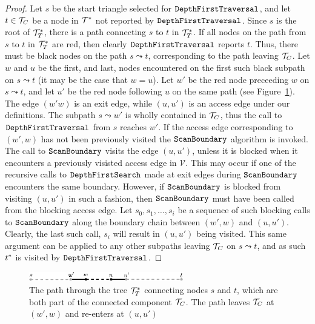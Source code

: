 {  \begin{proof}
  Let $s$ be the start triangle selected for $\texttt{DepthFirstTraversal}$,
  and let $t \in {\mathcal{T}}_C$ be a node in $\mathcal{T}^*$ not reported by 
  $\texttt{DepthFirstTraversal}$.
  Since $s$ is the root of $\mathcal{T}^*_T$, there is a path connecting $s$ 
  to $t$ in  $\mathcal{T}^*_T$. 
  If all nodes on the path from $s$ to $t$ in $\mathcal{T}^*_T$ are red, then
  clearly $\texttt{DepthFirstTraversal}$ reports $t$.
  Thus, there must be black nodes on the path $s \leadsto t$, corresponding to
  the path leaving ${\mathcal{T}}_C$.
  Let $w$ and $u$ be the first, and last, nodes encountered on the first such
  black subpath on $s \leadsto t$ (it may be the case that $w = u$).
  Let $w'$ be the red node preceeding $w$ on $s \leadsto t$, and let $u'$ be
  the red node following $u$ on the same path (see 
  Figure~\ref{fig:component_subpaths}).
  The edge $(w'w)$ is an exit edge, while $(u,u')$ is an access edge under
  our definitions. 
  The subpath $s \leadsto w'$ is wholly contained in ${\mathcal{T}}_C$, thus the call
  to $\texttt{DepthFirstTraversal}$ from $s$ reaches $w'$.
  If the access edge corresponding to $(w',w)$ has not 
  been previously visited the $\texttt{ScanBoundary}$ algorithm is invoked.
  The call to $\texttt{ScanBoundary}$ visits the edge $(u,u')$, unless it
  is blocked when it encounters a previously visisted access edge in 
  $\mathcal{V}$.
  This may  occur if one of the recursive 
  calls to $\texttt{DepthFirstSearch}$ made at exit edges during 
  $\texttt{ScanBoundary}$ 
  encounters the same boundary. 
  However, if $\texttt{ScanBoundary}$ is blocked from visiting $(u,u')$ in 
  such a fashion, then $\texttt{ScanBoundary}$ must have been called
  from the blocking access edge. 
  Let $s_0, s_1, \ldots, s_i$ be a sequence of such blocking calls to 
  $\texttt{ScanBoundary}$ along the boundary chain between $(w',w)$ 
  and $(u,u')$. 
  Clearly, the last such call, $s_i$ will result in $(u,u')$ being visited. 
  This same argument can be applied to any other subpaths leaving 
  ${\mathcal{T}}_C$ on $s \leadsto t$, and as such $t^*$ is visited by 
  $\texttt{DepthFirstTraversal}$.
  \end{proof}

  \begin{figure}[th]
	  \centering
		  \includegraphics[width=0.6\textwidth]{Fig12}
	  \caption[General component subpaths]{The path through the tree 
	  $\mathcal{T}^*_T$ connecting nodes $s$ and $t$, which are both
	  part of the connected component ${\mathcal{T}}_C$. 
	  The path leaves ${\mathcal{T}}_C$ at $(w',w)$ and re-enters at $(u,u')$}
	  \label{fig:component_subpaths}
  \end{figure}
  
}
